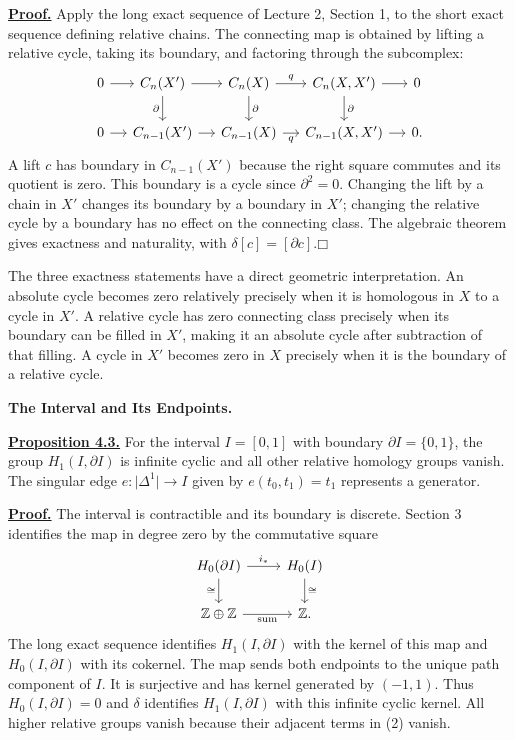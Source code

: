 \documentclass[11pt]{article}
\newcommand{\facecase}[1]{\par\Needspace{4\baselineskip}\smallskip\textbf{#1.}\par}
\begin{document}
\hypertarget{proof32}{}\textbf{\hyperlink{thm32}{Proof.}} Apply the long exact sequence of Lecture 2, Section 1, to the short exact sequence defining relative chains. The connecting map is obtained by lifting a relative cycle, taking its boundary, and factoring through the subcomplex:
\[
\begin{tikzcd}[column sep=small]
0\arrow[r]&C_n(X')\arrow[r]\arrow[d,"\partial"']&C_n(X)\arrow[r,"q"]\arrow[d,"\partial"]&C_n(X,X')\arrow[r]\arrow[d,"\partial"]&0\\
0\arrow[r]&C_{n-1}(X')\arrow[r]&C_{n-1}(X)\arrow[r,"q"']&C_{n-1}(X,X')\arrow[r]&0.
\end{tikzcd}
\]
A lift $c$ has boundary in $C_{n-1}(X')$ because the right square commutes and its quotient is zero. This boundary is a cycle since $\partial^2=0$. Changing the lift by a chain in $X'$ changes its boundary by a boundary in $X'$; changing the relative cycle by a boundary has no effect on the connecting class. The algebraic theorem gives exactness and naturality, with $\delta[c]=[\partial c]$.\hfill$\mdlgwhtsquare$

The three exactness statements have a direct geometric interpretation. An absolute cycle becomes zero relatively precisely when it is homologous in $X$ to a cycle in $X'$. A relative cycle has zero connecting class precisely when its boundary can be filled in $X'$, making it an absolute cycle after subtraction of that filling. A cycle in $X'$ becomes zero in $X$ precisely when it is the boundary of a relative cycle.

\facecase{The Interval and Its Endpoints}
\hypertarget{prop33}{}\textbf{\hyperlink{proof33}{Proposition 4.3.}} For the interval $I=[0,1]$ with boundary $\partial I=\{0,1\}$, the group $H_1(I,\partial I)$ is infinite cyclic and all other relative homology groups vanish. The singular edge $e:\lvert\Delta^1\rvert\to I$ given by $e(t_0,t_1)=t_1$ represents a generator.

\hypertarget{proof33}{}\textbf{\hyperlink{prop33}{Proof.}} The interval is contractible and its boundary is discrete. Section 3 identifies the map in degree zero by the commutative square
\[
\begin{tikzcd}
H_0(\partial I)\arrow[r,"i_*"]\arrow[d,"\cong"']&H_0(I)\arrow[d,"\cong"]\\
\mathbb Z\oplus\mathbb Z\arrow[r,"\mathrm{sum}"']&\mathbb Z.
\end{tikzcd}
\]
The long exact sequence identifies $H_1(I,\partial I)$ with the kernel of this map and $H_0(I,\partial I)$ with its cokernel. The map sends both endpoints to the unique path component of $I$. It is surjective and has kernel generated by $(-1,1)$. Thus $H_0(I,\partial I)=0$ and $\delta$ identifies $H_1(I,\partial I)$ with this infinite cyclic kernel. All higher relative groups vanish because their adjacent terms in (2) vanish.
\end{document}

